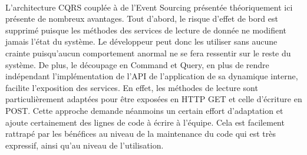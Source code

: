 \paragraph{}
\label{par:Organisation conclusion}
L'architecture CQRS couplée à de l'Event Sourcing présentée théoriquement ici présente de nombreux avantages.
Tout d'abord, le risque d'effet de bord est supprimé puisque les méthodes des services de lecture de donnée ne modifient jamais l'état du système.
Le développeur peut donc les utiliser sans aucune crainte puisqu'aucun comportement anormal ne se fera ressentir sur le reste du système.
De plus, le découpage en Command et Query, en plus de rendre indépendant l'implémentation de l'API de l'application de sa dynamique interne, facilite l'exposition des services.
En effet, les méthodes de lecture sont particulièrement adaptées pour être exposées en HTTP GET et celle d'écriture en POST.
Cette approche demande néanmoins un certain effort d'adaptation et ajoute certainement des lignes de code à écrire à l'équipe.
Cela est facilement rattrapé par les bénéfices au niveau de la maintenance du code qui est très expressif, ainsi qu'au niveau de l'utilisation.
